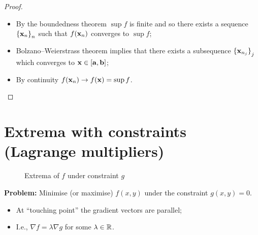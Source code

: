 \begin{proof}
    \begin{itemize}
        \item  By the boundedness theorem \(\sup f\) is finite and so there exists a sequence  \({\{\mathbf{x}_{n}\}}_{n}\)  such that \(f(\mathbf{x}_n)\) converges to \(\sup f\);
        \item Bolzano–Weierstrass theorem implies that there exists a subsequence  \({\{\mathbf{x}_{n_j}\}}_{j}\) which converges to \( \mathbf{x} \in [\mathbf{a},\mathbf{b}]\);
        \item By continuity \(f(\mathbf{x}_n) \to f(\mathbf{x}) = \sup f\).
    \end{itemize}
\end{proof}




\section{Extrema with constraints (Lagrange multipliers)}

\begin{figure}
    \noindent{}
    \caption{Extrema of \(f\) under constraint \(g\)}
\end{figure}



\textbf{Problem:}
Minimise (or maximise) \(f(x,y)\) under the constraint \(g(x,y) = 0\).
\begin{itemize}
    \item At ``touching point'' the gradient vectors are parallel;
    \item I.e., \(\nabla f = \lambda \nabla g\) for some \(\lambda \in \mathbb{R}\).
\end{itemize}



